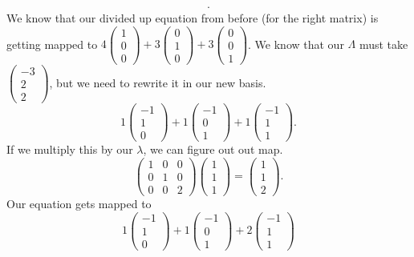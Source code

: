 \begin{eg}
\begin{align*}
  .\end{align*}
  We know that our divided up equation from before (for the right matrix) is getting mapped to $4\begin{pmatrix} 1\\0\\0 \end{pmatrix} +3\begin{pmatrix} 0\\1\\0 \end{pmatrix} +3\begin{pmatrix} 0\\0\\1 \end{pmatrix} $. We know that our $\Lambda$ must take $\begin{pmatrix} -3\\2\\2 \end{pmatrix} $, but we need to rewrite it in our new basis.\[
  1\begin{pmatrix} -1\\1\\0 \end{pmatrix} +1\begin{pmatrix} -1\\0\\1 \end{pmatrix} +1\begin{pmatrix} -1\\1\\1 \end{pmatrix} 
  .\] 
  If we multiply this by our $\lambda$, we can figure out out map. \[
    \begin{pmatrix} 1&0&0\\0&1&0\\0&0&2 \end{pmatrix} \begin{pmatrix} 1\\1\\1 \end{pmatrix} =\begin{pmatrix} 1\\1\\2 \end{pmatrix} 
  .\] 
  Our equation gets mapped to \[
  1\begin{pmatrix} -1\\1\\0 \end{pmatrix} +1\begin{pmatrix} -1\\0\\1 \end{pmatrix} +2\begin{pmatrix} -1\\1\\1 \end{pmatrix} 
\]
\end{eg}
